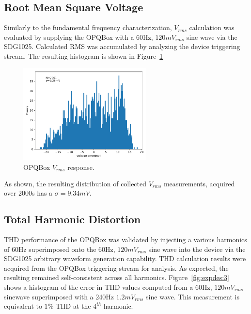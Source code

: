 \subsection{Root Mean Square Voltage}
Similarly to the fundamental frequency characterization, $V_{rms}$ calculation was evaluated by supplying the OPQBox with a 60Hz, $120mV_{rms}$ sine wave via the SDG1025.
Calculated RMS was accumulated by analyzing the device triggering stream.
The resulting histogram is shown in Figure~\ref{fig:expdes:2}

\begin{figure}[ht!]
    \begin{center}
        \includegraphics[width=0.6\textwidth]{img/box_eval/rms_histogram.pdf}
    \end{center}
    \caption{OPQBox $V_{rms}$ response.}
    \label{fig:expdes:2}
\end{figure}

As shown, the resulting distribution of collected $V_{rms}$ measurements, acquired over 2000s has a $\sigma=9.34mV$.

\subsection{Total Harmonic Distortion}

THD performance of the OPQBox was validated by injecting a various harmonics of 60Hz superimposed onto the 60Hz, $120mV_{rms}$ sine wave into the device via the SDG1025 arbitrary waveform generation capability.
THD calculation results were acquired from the OPQBox triggering stream for analysis.
As expected, the resulting remained self-consistent across all harmonics.
Figure~\ref{fig:expdes:3} shows a histogram of the error in THD values computed from a 60Hz, $120mV_{rms}$ sinewave superimposed with a 240Hz $1.2mV_{rms}$ sine wave.
This measurement is equivalent to $1\%$ THD at the $4^{th}$ harmonic.

